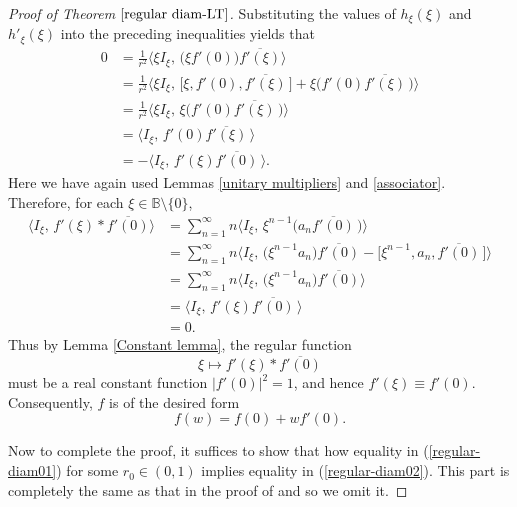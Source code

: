 \documentclass{amsart}
\theoremstyle{definition}
\theoremstyle{remark}
\numberwithin{equation}{section}
\begin{document}
\begin{proof}[Proof of Theorem $\ref{regular diam-LT}$]
Substituting the values of $h_{\xi}(\xi)$ and $h'_{\xi}(\xi)$ into the preceding inequalities yields that
\begin{equation}
\begin{split}
0&=\frac1 {r^2}\Big\langle \xi I_{\xi},\,  \big(\xi f'(0)\big)\overline{f'(\xi)}\Big\rangle
\\
&=\frac1 {r^2}\Big\langle \xi I_{\xi},\, \big[\xi, f'(0), \overline{f'(\xi)}\,\big]+\xi \big(f'(0)\overline{f'(\xi)}\,\big)\Big\rangle
\\
&=\frac1 {r^2}\Big\langle \xi I_{\xi},\,\xi \big(f'(0)\overline{f'(\xi)}\,\big)\Big\rangle
\\
&=\Big\langle I_{\xi},\, f'(0)\overline{f'(\xi)}\, \Big\rangle
\\
&=-\Big\langle I_{\xi},\, f'(\xi)\overline{f'(0)}\, \Big\rangle.
\end{split}
\end{equation}
Here we have again used Lemmas \ref{unitary multipliers} and \ref{associator}. Therefore, for each $\xi\in\mathbb B\setminus\{0\}$,
\begin{equation}\label{desried result}
\begin{split}
\Big\langle I_{\xi},\, f'(\xi)\ast\overline{f'(0)}\Big\rangle
&=\sum_{n=1}^{\infty} n \Big\langle I_{\xi},\, \xi^{n-1}\big(a_n\overline{f'(0)}\,\big)\Big\rangle
\\
&=\sum_{n=1}^{\infty} n \Big\langle I_{\xi},\, \big(\xi^{n-1}a_n\big)\overline{f'(0)}-\big[\xi^{n-1}, a_n, \overline{f'(0)}\,\big]\Big\rangle
\\
&=\sum_{n=1}^{\infty} n \Big\langle I_{\xi},\, \big(\xi^{n-1}a_n\big)\overline{f'(0)}\Big\rangle
\\
&=\Big\langle I_{\xi},\, f'(\xi)\overline{f'(0)}\, \Big\rangle
\\
&=0.
\end{split}
\end{equation}
Thus by Lemma \ref{Constant lemma}, the regular function
$$\xi\mapsto f'(\xi)\ast \overline{f'(0)}$$
must be a real constant function $|f'(0)|^2=1$, and hence $f'(\xi)\equiv f'(0)$. Consequently, $f$ is of the desired form
$$f(w)=f(0)+wf'(0).$$

Now to complete the proof, it suffices to show that how equality in (\ref{regular-diam01}) for some $r_0\in(0,1)$ implies equality in (\ref{regular-diam02}). This part is completely the same as that in the proof of \cite[Theorem 3.9]{Gen-Sar} and so we omit it.
\end{proof}
\end{document}
